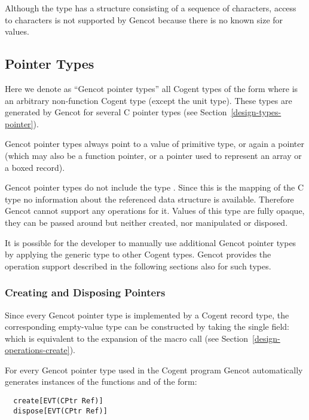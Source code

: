 Although the type  has a structure consisting of a sequence of characters, access to characters is not supported
by Gencot because there is no known size for  values.

\subsection{Pointer Types}
\label{design-operations-pointer}

Here we denote as ``Gencot pointer types'' all Cogent types of the form  where  is an arbitrary non-function
Cogent type (except the unit type). These types are generated by Gencot for several C pointer types (see Section~\ref{design-types-pointer}).

Gencot pointer types always point to a value of primitive type, or again a pointer 
(which may also be a function pointer, or a pointer used to represent an array or a boxed record).

Gencot pointer types do not include the type . Since this is the mapping of the C type  no information 
about the referenced data structure is available. Therefore Gencot cannot support any operations 
for it. Values of this type are fully opaque, they can be passed around but neither created, nor manipulated or disposed. 

It is possible for the developer to manually use additional Gencot pointer types by applying the generic type  to other
Cogent types. Gencot provides the operation support described in the following sections also for such types.

\subsubsection{Creating and Disposing Pointers}

Since every Gencot pointer type is implemented by a Cogent record type, the corresponding empty-value type can be constructed by 
taking the single field:  which is equivalent to the expansion of the macro call 
(see Section~\ref{design-operations-create}).

For every Gencot pointer type  used in the Cogent program Gencot automatically
generates instances of the functions  and  of the form:
\begin{verbatim}
  create[EVT(CPtr Ref)]
  dispose[EVT(CPtr Ref)]
\end{verbatim}

